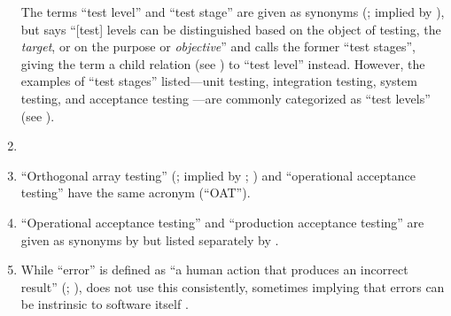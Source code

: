 \begin{enumerate}
          The terms ``test level'' and ``test stage'' are given as synonyms
          (\citealpISTQB{}; implied by \citealp[p.~9]{Gerrard2000a}), but
          \citet[p.~5\=/6]{SWEBOK2024} says ``[test] levels can be distinguished
          based on the object of testing, the \emph{target}, or on the purpose
          or \emph{objective}'' and calls the former ``test stages'', giving
          the term a child relation (see ) to ``test level''
          instead. However, the examples of ``test stages'' listed---unit
          testing, integration testing, system testing, and acceptance testing
          \citep[pp.~5\=/6 to 5\=/7]{SWEBOK2024}---are commonly categorized as
          ``test levels'' (see ).
    \item %
          \tolTestFlaw{}
    \item %
          ``Orthogonal array testing'' (\citealp[pp.~5\=/1, 5\=/11]{SWEBOK2024};
          implied by \citealp[pp.~467, 473]{Valcheva2013};
          \citealp[pp.~1573\==1577, 1580]{YuEtAl2011}) and ``operational
          acceptance testing'' \citep[p.~30]{Firesmith2015} have the same
          acronym (``OAT'').
    \item %
          ``Operational acceptance testing'' and ``production acceptance
          testing'' are given as synonyms by \citetISTQB{} but listed
          separately by \citet[p.~30]{Firesmith2015}.
    \item %
          While ``error'' is defined as ``a human action that produces an
          incorrect result'' (\citealp[pp.~12\=/3]{SWEBOK2024};
          \citealp[p.~399]{vanVliet2000}), \citeauthor{SWEBOK2024} does not
          use this consistently, sometimes implying that errors can be instrinsic
          to software itself \citeyearpar[pp.~4\=/9, 6\=/5, 7\=/3, 12\=/4,
              12\=/9, 12\=/13]{SWEBOK2024}.

\end{enumerate}

